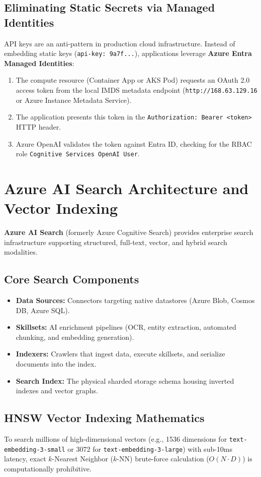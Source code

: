 \subsection{Eliminating Static Secrets via Managed Identities}
API keys are an anti-pattern in production cloud infrastructure. Instead of embedding static keys (\texttt{api-key: 9a7f...}), applications leverage \textbf{Azure Entra Managed Identities}:
\begin{enumerate}[leftmargin=15pt]
  \item The compute resource (Container App or AKS Pod) requests an OAuth 2.0 access token from the local IMDS metadata endpoint (\texttt{http://168.63.129.16} or Azure Instance Metadata Service).
  \item The application presents this token in the \texttt{Authorization: Bearer <token>} HTTP header.
  \item Azure OpenAI validates the token against Entra ID, checking for the RBAC role \texttt{Cognitive Services OpenAI User}.
\end{enumerate}

\section{Azure AI Search Architecture and Vector Indexing}

\textbf{Azure AI Search} (formerly Azure Cognitive Search) provides enterprise search infrastructure supporting structured, full-text, vector, and hybrid search modalities.

\subsection{Core Search Components}
\begin{itemize}[leftmargin=12pt]
  \item \textbf{Data Sources:} Connectors targeting native datastores (Azure Blob, Cosmos DB, Azure SQL).
  \item \textbf{Skillsets:} AI enrichment pipelines (OCR, entity extraction, automated chunking, and embedding generation).
  \item \textbf{Indexers:} Crawlers that ingest data, execute skillsets, and serialize documents into the index.
  \item \textbf{Search Index:} The physical sharded storage schema housing inverted indexes and vector graphs.
\end{itemize}

\subsection{HNSW Vector Indexing Mathematics}
To search millions of high-dimensional vectors (e.g., 1536 dimensions for \texttt{text-embedding-3-small} or 3072 for \texttt{text-embedding-3-large}) with sub-10ms latency, exact $k$-Nearest Neighbor ($k$-NN) brute-force calculation ($O(N \cdot D)$) is computationally prohibitive.

